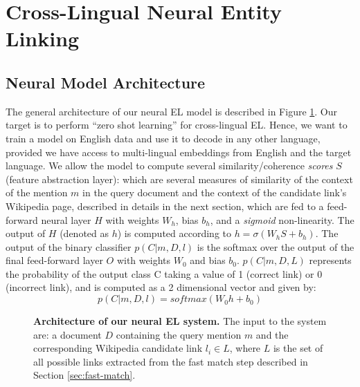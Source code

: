 \documentclass[letterpaper]{article} \usepackage{aaai18}  \usepackage{times}  \usepackage{helvet}  \usepackage{courier}  \usepackage{url}  \usepackage{graphicx}  \frenchspacing  \setlength{\pdfpagewidth}{8.5in}  \setlength{\pdfpageheight}{11in}  \usepackage{latexsym}
\begin{document}
 \section{Cross-Lingual Neural Entity Linking}
\label{sec:model}

\subsection{Neural Model Architecture}
The general architecture of our neural EL model is described in Figure \ref{fig:nn-model}.  Our target is to perform ``zero shot learning'' \cite{socher2013zero,palatucci2009zero} for cross-lingual EL. Hence, we want to train a model on English data and use it to decode in any other language, provided we have access to multi-lingual embeddings from English and the target language. We allow the model to compute several similarity/coherence \textit{scores} $S$ (feature abstraction layer): which are several measures of similarity of the context of the mention $m$ in the query document and the context of the candidate link's Wikipedia page, described in details in the next section, which are fed to a feed-forward neural layer $H$ with weights $W_h$, bias $b_h$, and a \textit{sigmoid} non-linearity. The output of $H$ (denoted as $h$) is computed according to $h = \sigma(W_h S + b_h)$.
The output of the binary classifier $p(C|m,D,l)$ is the softmax over the output of the final feed-forward layer $O$ with weights $W_0$ and bias $b_0$. $p(C|m,D,L)$ represents the probability of the output class C taking a value of 1 (correct link) or 0 (incorrect link), and is computed as a 2 dimensional vector and given by:
\begin{equation}
p(C|m,D,l) = softmax(W_0h+b_0)
\end{equation}
\begin{figure}[t]
\begin{center}
\end{center}
\caption{\textbf{Architecture of our neural EL system.} The input to the system are: a document $D$ containing the query mention $m$ and the corresponding Wikipedia candidate link $l_i\in L$, where $L$ is the set of all possible links extracted from the fast match step described in Section \ref{sec:fast-match}.}
\label{fig:nn-model}
\end{figure}
\end{document}
